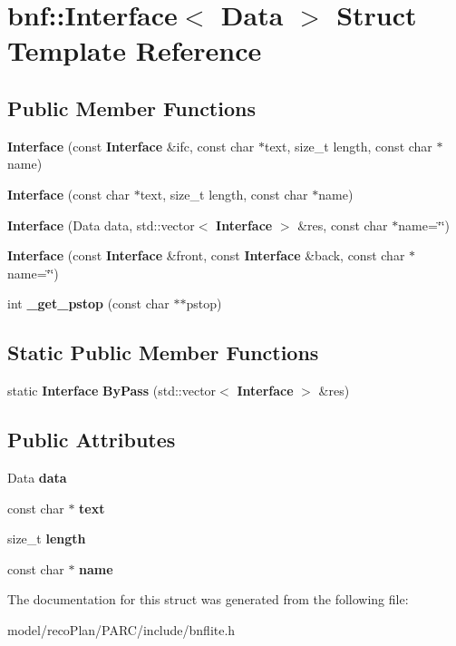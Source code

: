 \section{bnf\+:\+:Interface$<$ Data $>$ Struct Template Reference}
\label{structbnf_1_1_interface}
\subsection*{Public Member Functions}
\begin{DoxyCompactItemize}
\item 
\mbox{\label{structbnf_1_1_interface_a3ba100a5958043abd670dee6ef03f270}} 
{\bfseries Interface} (const \textbf{ Interface} \&ifc, const char $\ast$text, size\+\_\+t length, const char $\ast$name)
\item 
\mbox{\label{structbnf_1_1_interface_ad1e1e4c8bb31ff77f9d4788c79474aec}} 
{\bfseries Interface} (const char $\ast$text, size\+\_\+t length, const char $\ast$name)
\item 
\mbox{\label{structbnf_1_1_interface_a236a916bae10e78128bc491b098b4d14}} 
{\bfseries Interface} (Data data, std\+::vector$<$ \textbf{ Interface} $>$ \&res, const char $\ast$name=\char`\"{}\char`\"{})
\item 
\mbox{\label{structbnf_1_1_interface_a170e2e3bcecc0ba84db1c3f38c52e146}} 
{\bfseries Interface} (const \textbf{ Interface} \&front, const \textbf{ Interface} \&back, const char $\ast$name=\char`\"{}\char`\"{})
\item 
\mbox{\label{structbnf_1_1_interface_af5eb2a2b7f6f30b45a1de94a9c611914}} 
int {\bfseries \+\_\+get\+\_\+pstop} (const char $\ast$$\ast$pstop)
\end{DoxyCompactItemize}
\subsection*{Static Public Member Functions}
\begin{DoxyCompactItemize}
\item 
\mbox{\label{structbnf_1_1_interface_ace4d9c561d2dd98ab3c4adbc7649596a}} 
static \textbf{ Interface} {\bfseries By\+Pass} (std\+::vector$<$ \textbf{ Interface} $>$ \&res)
\end{DoxyCompactItemize}
\subsection*{Public Attributes}
\begin{DoxyCompactItemize}
\item 
\mbox{\label{structbnf_1_1_interface_aa58c913cebaaea8dfde2955386358b00}} 
Data {\bfseries data}
\item 
\mbox{\label{structbnf_1_1_interface_ac72ee5bc4b029637854bcb6589b8485b}} 
const char $\ast$ {\bfseries text}
\item 
\mbox{\label{structbnf_1_1_interface_af60c723b2583fd7be6bfd39c95db44fa}} 
size\+\_\+t {\bfseries length}
\item 
\mbox{\label{structbnf_1_1_interface_ad1692efc0dca5a71a0a2c1b417d22459}} 
const char $\ast$ {\bfseries name}
\end{DoxyCompactItemize}


The documentation for this struct was generated from the following file\+:\begin{DoxyCompactItemize}
\item 
model/reco\+Plan/\+P\+A\+R\+C/include/bnflite.\+h\end{DoxyCompactItemize}
